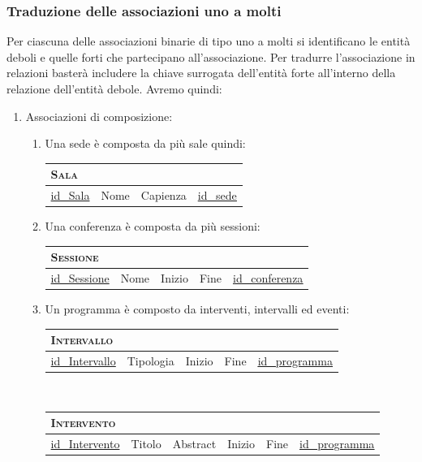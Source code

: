 \subsubsection{Traduzione delle associazioni uno a molti}
Per ciascuna delle associazioni binarie di tipo uno a molti si identificano le entità deboli e quelle forti che partecipano all'associazione. Per tradurre l'associazione in relazioni basterà includere la chiave surrogata dell'entità forte all'interno della relazione dell'entità debole. Avremo quindi:
\begin{enumerate}
	\item Associazioni di composizione:
	\begin{enumerate}
		\item Una sede è composta da più sale quindi:

		\begin{tabular}{|l|l|l|l|}
				\multicolumn{4}{l}{\textsc{Sala}} \\ \hline
				\underline{id\_Sala} & Nome & Capienza & \underline{\underline{id\_sede}}\\ \hline
			\end{tabular}

	\item Una conferenza è composta da più sessioni:

		\begin{tabular}{|l|l|l|l|l|}
			\multicolumn{4}{l}{\textsc{Sessione}} \\ \hline
			\underline{id\_Sessione} & Nome & Inizio & Fine & \underline{\underline{id\_conferenza}} \\ \hline
		\end{tabular}

\item Un programma è composto da interventi, intervalli ed eventi:

	\begin{tabular}{|l|l|l|l|l|}
		\multicolumn{5}{l}{\textsc{Intervallo}} \\ \hline
		\underline{id\_Intervallo} & Tipologia & Inizio & Fine & \underline{\underline{id\_programma}} \\ \hline
	\end{tabular}\\


	\begin{tabular}{|l|l|l|l|l|l|}
		\multicolumn{6}{l}{\textsc{Intervento}} \\ \hline
		\underline{id\_Intervento} & Titolo & Abstract & Inizio & Fine & \underline{\underline{id\_programma}}\\ \hline
	\end{tabular}\\



\end{enumerate}
\end{enumerate}
